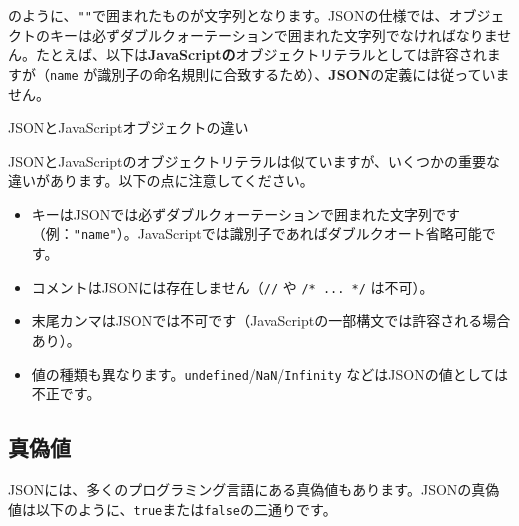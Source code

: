 のように、\texttt{""}で囲まれたものが文字列となります。JSONの仕様では、オブジェクトのキーは必ずダブルクォーテーションで囲まれた文字列でなければなりません。たとえば、以下は\textbf{JavaScriptの}オブジェクトリテラルとしては許容されますが（\texttt{name}
が識別子の命名規則に合致するため）、\textbf{JSON}の定義には従っていません。

\begin{Shaded}
\begin{Highlighting}[]
\NormalTok{\{}
  \OperatorTok{:} \OperatorTok{,}
  \OperatorTok{:}  
\NormalTok{\}}
\end{Highlighting}
\end{Shaded}

\begin{kokocolumn}{JSONとJavaScriptオブジェクトの違い}

JSONとJavaScriptのオブジェクトリテラルは似ていますが、いくつかの重要な違いがあります。以下の点に注意してください。

\begin{itemize}
\tightlist
\item
  キーはJSONでは必ずダブルクォーテーションで囲まれた文字列です（例：\texttt{"name"}）。JavaScriptでは識別子であればダブルクオート省略可能です。
\item
  コメントはJSONには存在しません（\texttt{//} や \texttt{/*\ ...\ */}
  は不可）。
\item
  末尾カンマはJSONでは不可です（JavaScriptの一部構文では許容される場合あり）。
\item
  値の種類も異なります。\texttt{undefined}/\texttt{NaN}/\texttt{Infinity}
  などはJSONの値としては不正です。
\end{itemize}

\end{kokocolumn}

\hypertarget{chapter3-ux771fux507dux5024}{%
\subsection{真偽値}\label{chapter3-ux771fux507dux5024}}

JSONには、多くのプログラミング言語にある真偽値もあります。JSONの真偽値は以下のように、\texttt{true}または\texttt{false}の二通りです。

\begin{Shaded}
\begin{Highlighting}[]
\end{Highlighting}
\end{Shaded}

